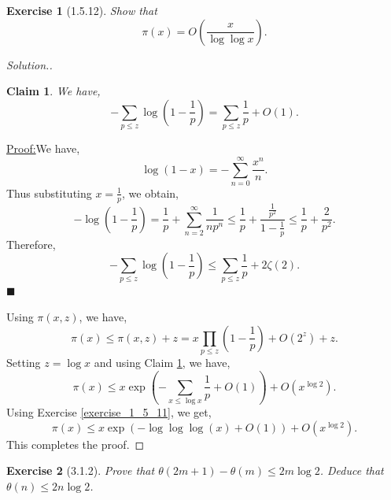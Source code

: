 \documentclass{article}
\newtheorem{exercise}{Exercise}[section]
\newtheorem{claim}{Claim}
\newenvironment{claimproof}[1]{\par\noindent\underline{Proof:}\space#1}{\hfill $\blacksquare$}
\begin{document}
\setcounter{claim}{0}
\begin{exercise}[1.5.12]
  Show that 
  \begin{equation*}
    \pi(x)=O\left({\frac x {\log\log x}}\right).
  \end{equation*}
\end{exercise}
\begin{proof}[Solution.]
  \begin{claim}
    We have,
    \begin{equation*}
      -\sum_{p\leq z}\log\left(1-{\frac 1 p}\right) = \sum_{p\leq z}{\frac 1 p}+O(1).
    \end{equation*}
    \label{claim_log_prime_asympt_approx}
  \end{claim}
  \begin{claimproof}
    We have,
    \begin{equation*}
      \log(1-x)=-\sum_{n=0}^\infty {\frac {x^n} n}.
    \end{equation*}
    Thus substituting $x={\frac 1 p}$, we obtain,
    \begin{equation*}
      -\log\left(1-{\frac 1 p}\right)  = {\frac 1 p }+\sum_{n=2}^\infty {\frac 1 {np^n}} \leq {\frac 1 p} +{\frac {{\frac 1 {p^2}}} {1-{\frac 1 p}}} \leq {\frac 1 p}+{\frac 2 {p^2}}.
    \end{equation*}
    Therefore,
    \begin{equation*}
      -\sum_{p\leq z}\log\left(1-{\frac 1 p}\right) \leq \sum_{p\leq z}{\frac 1 p}+2\zeta(2).
    \end{equation*}
  \end{claimproof}
  \par Using $\pi(x,z)$, we have,
  \begin{equation*}
    \pi(x) \leq \pi(x,z)+z = x\prod_{p\leq z}\left(1-{\frac 1 p}\right)+O(2^z)+z.
  \end{equation*}
  Setting $z=\log x$ and using Claim \ref{claim_log_prime_asympt_approx}, we have,
  \begin{equation*}
    \pi(x) \leq x\exp\left(-\sum_{x\leq \log x}{\frac 1 p}+O(1)\right)+O(x^{\log 2}).
  \end{equation*}
  Using Exercise \ref{exercise_1_5_11}, we get,
  \begin{equation*}
    \pi(x) \leq x\exp\left(-\log\log\log(x)+O(1)\right)+O(x^{\log 2}).
  \end{equation*}
  This completes the proof.
\end{proof}
\begin{exercise}[3.1.2]
  Prove that $\theta(2m+1)-\theta(m)\leq 2m\log 2$. Deduce that $\theta(n)\leq 2n\log 2$.
\end{exercise}
\end{document}
